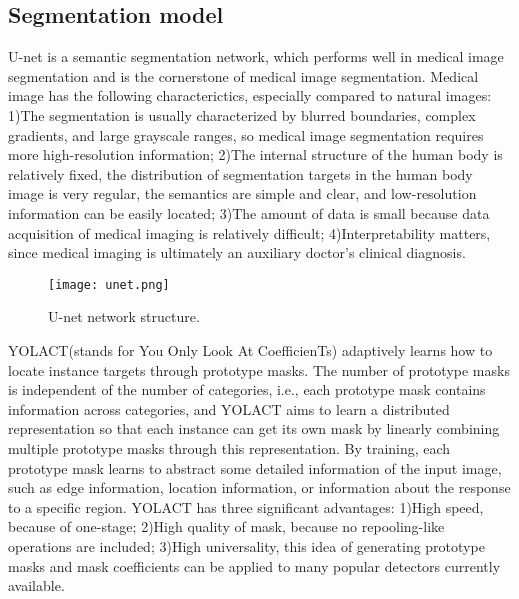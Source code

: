 \documentclass[12pt, a4paper]{article}
\begin{document}
\subsection{Segmentation model}

U-net\cite{5} is a semantic segmentation network, which performs well in medical image segmentation and is the cornerstone of medical image segmentation\cite{6}. Medical image has the following characterictics, especially compared to natural images: 1)The segmentation is usually characterized by blurred boundaries, complex gradients, and large grayscale ranges, so medical image segmentation requires more high-resolution information; 2)The internal structure of the human body is relatively fixed, the distribution of segmentation targets in the human body image is very regular, the semantics are simple and clear, and low-resolution information can be easily located; 3)The amount of data is small because data acquisition of medical imaging is relatively difficult; 4)Interpretability matters, since medical imaging is ultimately an auxiliary doctor's clinical diagnosis.

\begin{figure}[tbh]
	\centering
	\texttt{[image: unet.png]}
	\vspace*{-1mm}
	\caption{U-net network structure.}
	\label{fig: fig1}
\end{figure}


YOLACT(stands for You Only Look At CoefficienTs)\cite{7} adaptively learns how to locate instance targets through prototype masks. The number of prototype masks is independent of the number of categories, i.e., each prototype mask contains information across categories, and YOLACT aims to learn a distributed representation so that each instance can get its own mask by linearly combining multiple prototype masks through this representation. By training, each prototype mask learns to abstract some detailed information of the input image, such as edge information, location information, or information about the response to a specific region. YOLACT has three significant advantages: 1)High speed, because of one-stage; 2)High quality of mask, because no repooling-like operations are included; 3)High universality, this idea of generating prototype masks and mask coefficients can be applied to many popular detectors currently available.
\end{document}
